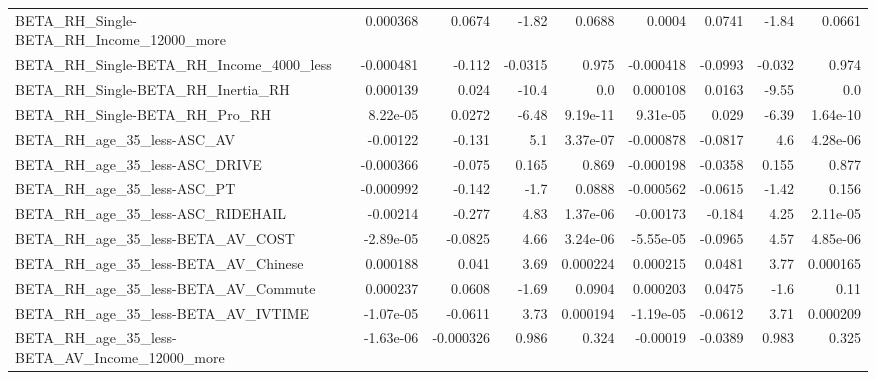 \begin{tabular}{lrrrrrrrr}
BETA\_RH\_Single-BETA\_RH\_Income\_12000\_more           &    0.000368 &       0.0674 &    -1.82 &   0.0688 &     0.0004 &      0.0741 &        -1.84 &        0.0661 \\
BETA\_RH\_Single-BETA\_RH\_Income\_4000\_less            &   -0.000481 &       -0.112 &  -0.0315 &    0.975 &  -0.000418 &     -0.0993 &       -0.032 &         0.974 \\
BETA\_RH\_Single-BETA\_RH\_Inertia\_RH                  &    0.000139 &        0.024 &    -10.4 &      0.0 &   0.000108 &      0.0163 &        -9.55 &           0.0 \\
BETA\_RH\_Single-BETA\_RH\_Pro\_RH                      &    8.22e-05 &       0.0272 &    -6.48 & 9.19e-11 &   9.31e-05 &       0.029 &        -6.39 &      1.64e-10 \\
BETA\_RH\_age\_35\_less-ASC\_AV                         &    -0.00122 &       -0.131 &      5.1 & 3.37e-07 &  -0.000878 &     -0.0817 &          4.6 &      4.28e-06 \\
BETA\_RH\_age\_35\_less-ASC\_DRIVE                      &   -0.000366 &       -0.075 &    0.165 &    0.869 &  -0.000198 &     -0.0358 &        0.155 &         0.877 \\
BETA\_RH\_age\_35\_less-ASC\_PT                         &   -0.000992 &       -0.142 &     -1.7 &   0.0888 &  -0.000562 &     -0.0615 &        -1.42 &         0.156 \\
BETA\_RH\_age\_35\_less-ASC\_RIDEHAIL                   &    -0.00214 &       -0.277 &     4.83 & 1.37e-06 &   -0.00173 &      -0.184 &         4.25 &      2.11e-05 \\
BETA\_RH\_age\_35\_less-BETA\_AV\_COST                   &   -2.89e-05 &      -0.0825 &     4.66 & 3.24e-06 &  -5.55e-05 &     -0.0965 &         4.57 &      4.85e-06 \\
BETA\_RH\_age\_35\_less-BETA\_AV\_Chinese                &    0.000188 &        0.041 &     3.69 & 0.000224 &   0.000215 &      0.0481 &         3.77 &      0.000165 \\
BETA\_RH\_age\_35\_less-BETA\_AV\_Commute                &    0.000237 &       0.0608 &    -1.69 &   0.0904 &   0.000203 &      0.0475 &         -1.6 &          0.11 \\
BETA\_RH\_age\_35\_less-BETA\_AV\_IVTIME                 &   -1.07e-05 &      -0.0611 &     3.73 & 0.000194 &  -1.19e-05 &     -0.0612 &         3.71 &      0.000209 \\
BETA\_RH\_age\_35\_less-BETA\_AV\_Income\_12000\_more      &   -1.63e-06 &    -0.000326 &    0.986 &    0.324 &   -0.00019 &     -0.0389 &        0.983 &         0.325 \\

\end{tabular}
